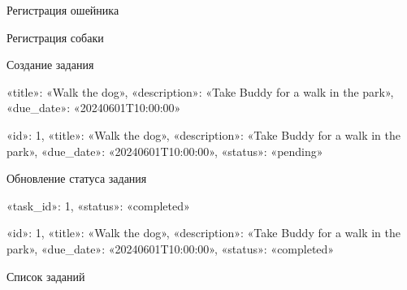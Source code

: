 \documentclass[letterpaper,10pt,russian]{sphinxmanual}
\begin{document}
\sphinxAtStartPar
Регистрация ошейника

\begin{sphinxVerbatim}[commandchars=\\\{\}]
 
 
\end{sphinxVerbatim}

\sphinxAtStartPar
Регистрация собаки

\begin{sphinxVerbatim}[commandchars=\\\{\}]
 
 
\end{sphinxVerbatim}

\sphinxAtStartPar
Создание задания
\begin{description}
\sphinxAtStartPar
«title»: «Walk the dog»,
«description»: «Take Buddy for a walk in the park»,
«due\_date»: «2024\sphinxhyphen{}06\sphinxhyphen{}01T10:00:00»

\sphinxAtStartPar
«id»: 1,
«title»: «Walk the dog»,
«description»: «Take Buddy for a walk in the park»,
«due\_date»: «2024\sphinxhyphen{}06\sphinxhyphen{}01T10:00:00»,
«status»: «pending»

\end{description}

\sphinxAtStartPar
Обновление статуса задания
\begin{description}
\sphinxAtStartPar
«task\_id»: 1,
«status»: «completed»

\sphinxAtStartPar
«id»: 1,
«title»: «Walk the dog»,
«description»: «Take Buddy for a walk in the park»,
«due\_date»: «2024\sphinxhyphen{}06\sphinxhyphen{}01T10:00:00»,
«status»: «completed»

\end{description}

\sphinxAtStartPar
Список заданий
\end{document}
